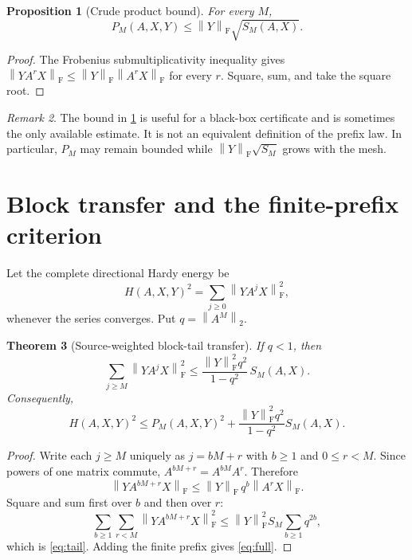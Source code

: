 \documentclass[11pt]{article}
\newtheorem{theorem}{Theorem}[section]
\newtheorem{proposition}[theorem]{Proposition}
\theoremstyle{definition}
\theoremstyle{remark}
\newtheorem{remark}[theorem]{Remark}
\newcommand{\norm}[1]{\left\lVert#1\right\rVert}
\newcommand{\F}{\mathrm F}
\begin{document}
\begin{proposition}[Crude product bound]
 \label{prop:crude}
 For every $M$,
 \begin{equation}
  P_M(A,X,Y)\le \norm Y_{\F}\sqrt{S_M(A,X)}.
  \label{eq:crude}
 \end{equation}
\end{proposition}

\begin{proof}
 The Frobenius submultiplicativity inequality gives
 $\norm{YA^rX}_{\F}\le\norm Y_{\F}\norm{A^rX}_{\F}$ for every $r$.
 Square, sum, and take the square root.
\end{proof}

\begin{remark}
 The bound in \cref{prop:crude} is useful for a black-box certificate and is
 sometimes the only available estimate.  It is not an equivalent definition
 of the prefix law.  In particular, $P_M$ may remain bounded while
 $\norm Y_{\F}\sqrt{S_M}$ grows with the mesh.
\end{remark}

\section{Block transfer and the finite-prefix criterion}
\label{sec:block}

Let the complete directional Hardy energy be
\begin{equation}
 H(A,X,Y)^2=\sum_{j\ge0}\norm{YA^jX}_{\F}^2,
 \label{eq:hardy}
\end{equation}
whenever the series converges.  Put $q=\norm{A^M}_2$.

\begin{theorem}[Source-weighted block-tail transfer]
 \label{thm:tail}
 If $q<1$, then
 \begin{equation}
 \sum_{j\ge M}\norm{YA^jX}_{\F}^2
 \le
 \frac{\norm Y_{\F}^2q^2}{1-q^2}\,S_M(A,X).
 \label{eq:tail}
 \end{equation}
 Consequently,
 \begin{equation}
 H(A,X,Y)^2\le P_M(A,X,Y)^2
 +\frac{\norm Y_{\F}^2q^2}{1-q^2}S_M(A,X).
 \label{eq:full}
 \end{equation}
\end{theorem}

\begin{proof}
 Write each $j\ge M$ uniquely as $j=bM+r$ with $b\ge1$ and
 $0\le r<M$.  Since powers of one matrix commute,
 $A^{bM+r}=A^{bM}A^r$.  Therefore
 \[
 \norm{YA^{bM+r}X}_{\F}
 \le \norm Y_{\F}\,q^b\norm{A^rX}_{\F}.
 \]
 Square and sum first over $b$ and then over $r$:
 \[
 \sum_{b\ge1}\sum_{r<M}\norm{YA^{bM+r}X}_{\F}^2
 \le \norm Y_{\F}^2S_M\sum_{b\ge1}q^{2b},
 \]
 which is \eqref{eq:tail}.  Adding the finite prefix gives
 \eqref{eq:full}.
\end{proof}
\end{document}
